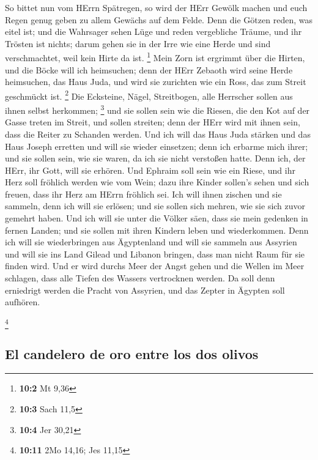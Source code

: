  So bittet nun vom HErrn Spätregen, so wird der HErr
Gewölk machen und euch Regen genug geben zu allem Gewächs auf dem Felde.
 Denn die Götzen reden, was eitel ist; und die Wahrsager
sehen Lüge und reden vergebliche Träume, und ihr Trösten ist nichts;
darum gehen sie in der Irre wie eine Herde und sind verschmachtet, weil
kein Hirte da ist. \footnote{\textbf{10:2} Mt 9,36}  Mein
Zorn ist ergrimmt über die Hirten, und die Böcke will ich heimsuchen;
denn der HErr Zebaoth wird seine Herde heimsuchen, das Haus Juda, und
wird sie zurichten wie ein Ross, das zum Streit geschmückt ist.
\footnote{\textbf{10:3} Sach 11,5}  Die Ecksteine, Nägel,
Streitbogen, alle Herrscher sollen aus ihnen selbst herkommen;
\footnote{\textbf{10:4} Jer 30,21}  und sie sollen sein
wie die Riesen, die den Kot auf der Gasse treten im Streit, und sollen
streiten; denn der HErr wird mit ihnen sein, dass die Reiter zu Schanden
werden.  Und ich will das Haus Juda stärken und das Haus
Joseph erretten und will sie wieder einsetzen; denn ich erbarme mich
ihrer; und sie sollen sein, wie sie waren, da ich sie nicht verstoßen
hatte. Denn ich, der HErr, ihr Gott, will sie erhören. 
Und Ephraim soll sein wie ein Riese, und ihr Herz soll fröhlich werden
wie vom Wein; dazu ihre Kinder sollen's sehen und sich freuen, dass ihr
Herz am HErrn fröhlich sei.  Ich will ihnen zischen und
sie sammeln, denn ich will sie erlösen; und sie sollen sich mehren, wie
sie sich zuvor gemehrt haben.  Und ich will sie unter die
Völker säen, dass sie mein gedenken in fernen Landen; und sie sollen mit
ihren Kindern leben und wiederkommen.  Denn ich will sie
wiederbringen aus Ägyptenland und will sie sammeln aus Assyrien und will
sie ins Land Gilead und Libanon bringen, dass man nicht Raum für sie
finden wird.  Und er wird durchs Meer der Angst gehen und
die Wellen im Meer schlagen, dass alle Tiefen des Wassers vertrocknen
werden. Da soll denn erniedrigt werden die Pracht von Assyrien, und das
Zepter in Ägypten soll aufhören.

\footnote{\textbf{10:11} 2Mo 14,16; Jes 11,15}

\hypertarget{el-candelero-de-oro-entre-los-dos-olivos}{%
\subsection{El candelero de oro entre los dos
olivos}\label{el-candelero-de-oro-entre-los-dos-olivos}}

